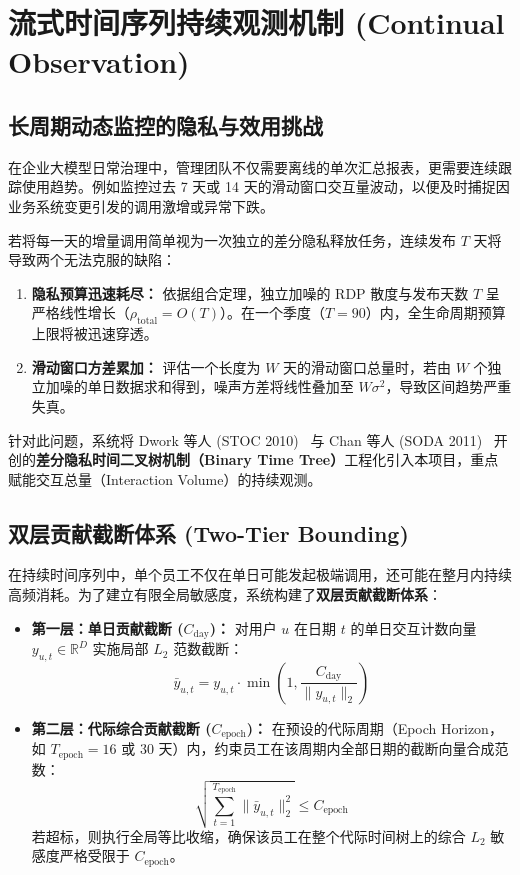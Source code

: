 \section{流式时间序列持续观测机制 (Continual Observation)}
\label{sec:continual}

\subsection{长周期动态监控的隐私与效用挑战}
在企业大模型日常治理中，管理团队不仅需要离线的单次汇总报表，更需要连续跟踪使用趋势。例如监控过去 7 天或 14 天的滑动窗口交互量波动，以便及时捕捉因业务系统变更引发的调用激增或异常下跌。

若将每一天的增量调用简单视为一次独立的差分隐私释放任务，连续发布 $T$ 天将导致两个无法克服的缺陷：
\begin{enumerate}[label=(\arabic*), leftmargin=2em]
  \item \textbf{隐私预算迅速耗尽：} 依据组合定理，独立加噪的 RDP 散度与发布天数 $T$ 呈严格线性增长（$\rho_{\text{total}} = O(T)$）。在一个季度（$T=90$）内，全生命周期预算上限将被迅速穿透。
  \item \textbf{滑动窗口方差累加：} 评估一个长度为 $W$ 天的滑动窗口总量时，若由 $W$ 个独立加噪的单日数据求和得到，噪声方差将线性叠加至 $W \sigma^2$，导致区间趋势严重失真。
\end{enumerate}

针对此问题，系统将 Dwork 等人 (STOC 2010)~\cite{dwork2010continual} 与 Chan 等人 (SODA 2011)~\cite{chan2011private} 开创的\textbf{差分隐私时间二叉树机制（Binary Time Tree）}工程化引入本项目，重点赋能交互总量（Interaction Volume）的持续观测。

\subsection{双层贡献截断体系 (Two-Tier Bounding)}
在持续时间序列中，单个员工不仅在单日可能发起极端调用，还可能在整月内持续高频消耗。为了建立有限全局敏感度，系统构建了\textbf{双层贡献截断体系}：
\begin{itemize}[leftmargin=2em]
  \item \textbf{第一层：单日贡献截断 ($C_{\text{day}}$)：}
    对用户 $u$ 在日期 $t$ 的单日交互计数向量 $y_{u, t} \in \mathbb{R}^D$ 实施局部 $L_2$ 范数截断：
    \begin{equation}
      \bar{y}_{u, t} = y_{u, t} \cdot \min\left(1, \frac{C_{\text{day}}}{\|y_{u, t}\|_2}\right)
    \end{equation}
  \item \textbf{第二层：代际综合贡献截断 ($C_{\text{epoch}}$)：}
    在预设的代际周期（Epoch Horizon，如 $T_{\text{epoch}} = 16$ 或 $30$ 天）内，约束员工在该周期内全部日期的截断向量合成范数：
    \begin{equation}
      \sqrt{\sum_{t=1}^{T_{\text{epoch}}} \|\bar{y}_{u, t}\|_2^2} \le C_{\text{epoch}}
    \end{equation}
    若超标，则执行全局等比收缩，确保该员工在整个代际时间树上的综合 $L_2$ 敏感度严格受限于 $C_{\text{epoch}}$。
\end{itemize}

